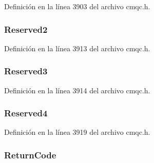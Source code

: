 Definición en la línea 3903 del archivo cmqc.\+h.

\hypertarget{structtag_m_q_c_i_h_a5bd63300a918efb6afe00854d37ab810}{}
\subsubsection[{Reserved2}]{ Reserved2}\label{structtag_m_q_c_i_h_a5bd63300a918efb6afe00854d37ab810}


Definición en la línea 3913 del archivo cmqc.\+h.

\hypertarget{structtag_m_q_c_i_h_aac45decc307174b157b25f4dd7552071}{}
\subsubsection[{Reserved3}]{ Reserved3}\label{structtag_m_q_c_i_h_aac45decc307174b157b25f4dd7552071}


Definición en la línea 3914 del archivo cmqc.\+h.

\hypertarget{structtag_m_q_c_i_h_a60b048be704630a4075821f1b5e5eecc}{}
\subsubsection[{Reserved4}]{ Reserved4}\label{structtag_m_q_c_i_h_a60b048be704630a4075821f1b5e5eecc}


Definición en la línea 3919 del archivo cmqc.\+h.

\hypertarget{structtag_m_q_c_i_h_ae571e9fa07717fe4448546095367c458}{}
\subsubsection[{Return\+Code}]{ Return\+Code}\label{structtag_m_q_c_i_h_ae571e9fa07717fe4448546095367c458}


